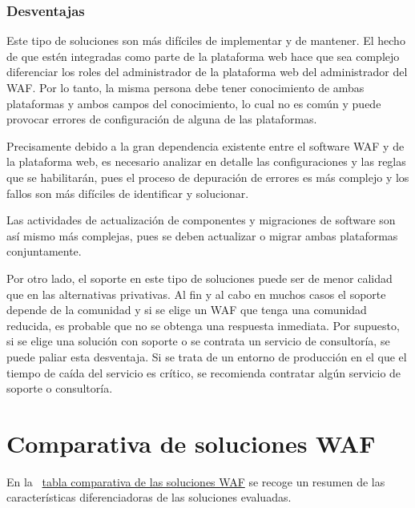 \subsubsection{Desventajas}
\par Este tipo de soluciones son más difíciles de implementar y de mantener. El hecho de que estén integradas como parte de la plataforma web
hace que sea complejo diferenciar los roles del administrador de la plataforma web del administrador del WAF. Por lo tanto, la misma persona
debe tener conocimiento de ambas plataformas y ambos campos del conocimiento, lo cual no es común y puede provocar errores de configuración
de alguna de las plataformas.
\par Precisamente debido a la gran dependencia existente entre el software WAF y de la plataforma web, es necesario analizar en detalle las
configuraciones y las reglas que se habilitarán, pues el proceso de depuración de errores es más complejo y los fallos son más difíciles de
identificar y solucionar.
\par Las actividades de actualización de componentes y migraciones de software son así mismo más complejas, pues se deben actualizar o migrar
ambas plataformas conjuntamente.
\par Por otro lado, el soporte en este tipo de soluciones puede ser de menor calidad que en las alternativas privativas. Al fin y al cabo en
muchos casos el soporte depende de la comunidad y si se elige un WAF que tenga una comunidad reducida, es probable que no se obtenga una
respuesta inmediata. Por supuesto, si se elige una solución con soporte o se contrata un servicio de consultoría, se puede paliar esta
desventaja. Si se trata de un entorno de producción en el que el tiempo de caída del servicio es crítico, se recomienda contratar algún
servicio de soporte o consultoría.


\section{Comparativa de soluciones WAF}
\par En la {~\hyperref[tab:wafcomparison]{tabla comparativa de las soluciones WAF}} se recoge un resumen de las características diferenciadoras de las soluciones evaluadas.

